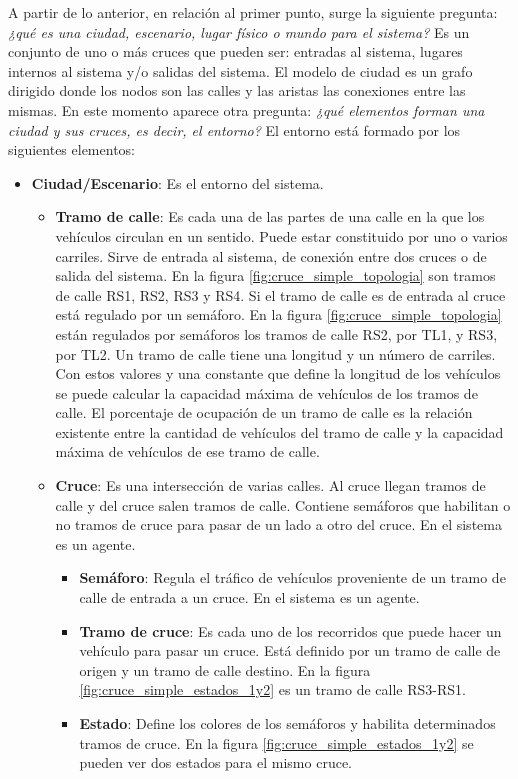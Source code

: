 A partir de lo anterior, en relación al primer punto, surge la siguiente pregunta: \textit{¿qué es una ciudad, escenario, lugar físico o mundo para el sistema?} Es un conjunto de uno o más cruces que pueden ser: entradas al sistema, lugares internos al sistema y/o salidas del sistema. El modelo de ciudad es un grafo dirigido donde los nodos son las calles y las aristas las conexiones entre las mismas. En este momento aparece otra pregunta: \textit{¿qué elementos forman una ciudad y sus cruces, es decir, el entorno?} El entorno está formado por los siguientes elementos:
\begin{itemize}
    \item \textbf{Ciudad/Escenario}: Es el entorno del sistema.
    \begin{itemize}
        \item \textbf{Tramo de calle}: Es cada una de las partes de una calle en la que los vehículos circulan en un sentido. Puede estar constituido por uno o varios carriles. Sirve de entrada al sistema, de conexión entre dos cruces o de salida del sistema. En la figura \ref{fig:cruce_simple_topologia} son tramos de calle RS1, RS2, RS3 y RS4. Si el tramo de calle es de entrada al cruce está regulado por un semáforo. En la figura \ref{fig:cruce_simple_topologia} están regulados por semáforos los tramos de calle RS2, por TL1, y RS3, por TL2. \newline 
        Un tramo de calle tiene una longitud y un número de carriles. Con estos valores y una constante que define la longitud de los vehículos se puede calcular la capacidad máxima de vehículos de los tramos de calle. El porcentaje de ocupación de un tramo de calle es la relación existente entre la cantidad de vehículos del tramo de calle y la capacidad máxima de vehículos de ese tramo de calle.
        \item \textbf{Cruce}: Es una intersección de varias calles. Al cruce llegan tramos de calle y del cruce salen tramos de calle. Contiene semáforos que habilitan o no tramos de cruce para pasar de un lado a otro del cruce. En el sistema es un agente.
        \begin{itemize}
            \item \textbf{Semáforo}: Regula el tráfico de vehículos proveniente de un tramo de calle de entrada a un cruce. En el sistema es un agente.
            \item \textbf{Tramo de cruce}: Es cada uno de los recorridos que puede hacer un vehículo para pasar un cruce. Está definido por un tramo de calle de origen y un tramo de calle destino. En la figura \ref{fig:cruce_simple_estados_1y2} es un tramo de calle RS3-RS1.
            \item \textbf{Estado}: Define los colores de los semáforos y habilita determinados tramos de cruce. En la figura \ref{fig:cruce_simple_estados_1y2} se pueden ver dos estados para el mismo cruce. 
        \end{itemize}
    \end{itemize}
\end{itemize}

